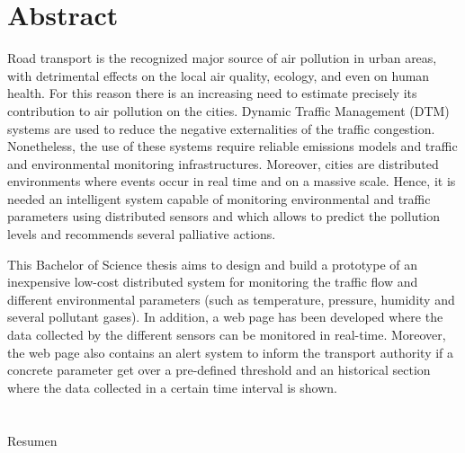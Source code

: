 
\chapter{Abstract}

Road transport is the recognized major source of air pollution in urban areas, with detrimental effects on the local air quality, ecology, and even on human health. For this reason there is an increasing need to estimate precisely its contribution to air pollution on the cities. Dynamic Traffic Management (DTM) systems are used to reduce the negative externalities of the traffic congestion. Nonetheless, the use of these systems require reliable emissions models and traffic and environmental monitoring infrastructures. Moreover, cities are distributed environments where events occur in real time and on a massive scale. Hence, it is needed an intelligent system capable of monitoring environmental and traffic parameters using distributed sensors and which allows to predict the pollution levels and recommends several palliative actions.

This Bachelor of Science thesis aims to design and build a prototype of an inexpensive low-cost distributed system for monitoring the traffic flow and different environmental parameters (such as temperature, pressure, humidity and several pollutant gases). In addition, a web page has been developed where the data collected by the different sensors can be monitored in real-time. Moreover, the web page also contains an alert system to inform the transport authority if a concrete parameter get over a pre-defined threshold and an historical section where the data collected in a certain time interval is shown.


\chapter{} %

Resumen



